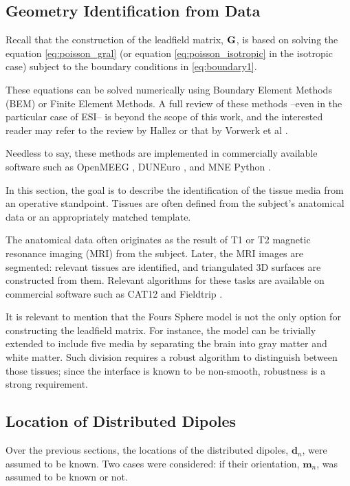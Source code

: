\subsection{Geometry Identification from Data}

Recall that the construction of the leadfield matrix, $\mathbf{G}$, is based on solving the equation \eqref{eq:poisson_gral} (or equation \eqref{eq:poisson_isotropic} in the isotropic case) 
subject to the boundary conditions in \eqref{eq:boundary1}.

These equations can be solved numerically using Boundary Element Methods (BEM) or Finite Element Methods.
%
A full review of these methods --even in the particular case of ESI-- is beyond the scope of this work, and the interested reader may refer to the review by Hallez \cite{hallez2007review} or that by Vorwerk et al \cite{vorwerk2012comparison}.

Needless to say, these methods are implemented in commercially available software such as OpenMEEG \cite{gramfort2010openmeeg}, DUNEuro \cite{schrader2021duneuro}, and MNE Python \cite{GramfortEtAl2013a}.

In this section, the goal is to describe the identification of the tissue media from an operative standpoint.
%
Tissues are often defined from the subject's anatomical data or an appropriately matched template.

The anatomical data often originates as the result of T1 or T2 magnetic resonance imaging (MRI) from the subject. 
%
Later, the MRI images are segmented: relevant tissues are identified, and triangulated 3D surfaces are constructed from them. 
%
Relevant algorithms for these tasks are available on commercial software such as CAT12 \cite{gaser2022cat} and Fieldtrip \cite{oostenveld2011fieldtrip}.

It is relevant to mention that the Fours Sphere model is not the only option for constructing the leadfield matrix. 
%
For instance, the model can be trivially extended to include five media by separating the brain into gray matter and white matter.
%
Such division requires a robust algorithm to distinguish between those tissues; since the interface is known to be non-smooth, robustness is a strong requirement.

\subsection{Location of Distributed Dipoles}

Over the previous sections, the locations of the distributed dipoles, $\mathbf{d}_n$, were assumed to be known.
%
Two cases were considered: if their orientation, $\mathbf{m}_n$, was assumed to be known or not.

